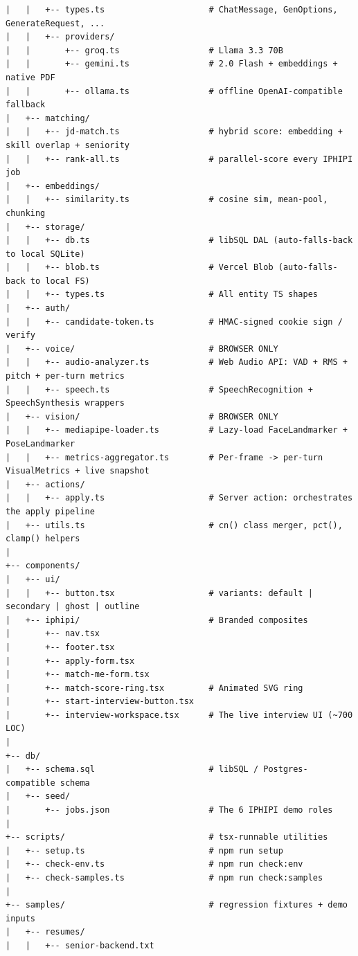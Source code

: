 \documentclass[11pt,a4paper]{article}
\begin{document}
\begin{lstlisting}[basicstyle=\ttfamily\scriptsize]
|   |   +-- types.ts                     # ChatMessage, GenOptions, GenerateRequest, ...
|   |   +-- providers/
|   |       +-- groq.ts                  # Llama 3.3 70B
|   |       +-- gemini.ts                # 2.0 Flash + embeddings + native PDF
|   |       +-- ollama.ts                # offline OpenAI-compatible fallback
|   +-- matching/
|   |   +-- jd-match.ts                  # hybrid score: embedding + skill overlap + seniority
|   |   +-- rank-all.ts                  # parallel-score every IPHIPI job
|   +-- embeddings/
|   |   +-- similarity.ts                # cosine sim, mean-pool, chunking
|   +-- storage/
|   |   +-- db.ts                        # libSQL DAL (auto-falls-back to local SQLite)
|   |   +-- blob.ts                      # Vercel Blob (auto-falls-back to local FS)
|   |   +-- types.ts                     # All entity TS shapes
|   +-- auth/
|   |   +-- candidate-token.ts           # HMAC-signed cookie sign / verify
|   +-- voice/                           # BROWSER ONLY
|   |   +-- audio-analyzer.ts            # Web Audio API: VAD + RMS + pitch + per-turn metrics
|   |   +-- speech.ts                    # SpeechRecognition + SpeechSynthesis wrappers
|   +-- vision/                          # BROWSER ONLY
|   |   +-- mediapipe-loader.ts          # Lazy-load FaceLandmarker + PoseLandmarker
|   |   +-- metrics-aggregator.ts        # Per-frame -> per-turn VisualMetrics + live snapshot
|   +-- actions/
|   |   +-- apply.ts                     # Server action: orchestrates the apply pipeline
|   +-- utils.ts                         # cn() class merger, pct(), clamp() helpers
|
+-- components/
|   +-- ui/
|   |   +-- button.tsx                   # variants: default | secondary | ghost | outline
|   +-- iphipi/                          # Branded composites
|       +-- nav.tsx
|       +-- footer.tsx
|       +-- apply-form.tsx
|       +-- match-me-form.tsx
|       +-- match-score-ring.tsx         # Animated SVG ring
|       +-- start-interview-button.tsx
|       +-- interview-workspace.tsx      # The live interview UI (~700 LOC)
|
+-- db/
|   +-- schema.sql                       # libSQL / Postgres-compatible schema
|   +-- seed/
|       +-- jobs.json                    # The 6 IPHIPI demo roles
|
+-- scripts/                             # tsx-runnable utilities
|   +-- setup.ts                         # npm run setup
|   +-- check-env.ts                     # npm run check:env
|   +-- check-samples.ts                 # npm run check:samples
|
+-- samples/                             # regression fixtures + demo inputs
|   +-- resumes/
|   |   +-- senior-backend.txt

\end{lstlisting}
\end{document}
